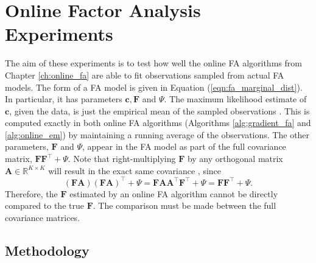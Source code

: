 \documentclass[msc,deptreport.inf]{infthesis} %
\newcommand{\matr}[1]{\mathbf{#1}}
\newcommand{\R}{\mathbb R}
\begin{document}
\chapter{Online Factor Analysis Experiments}\label{ch:online_fa_experiments}

The aim of these experiments is to test how well the online FA algorithms from Chapter \ref{ch:online_fa} are able to fit observations sampled from actual FA models. The form of a FA model is given in Equation (\ref{eqn:fa_marginal_dist}). In particular, it has parameters $\matr{c}, \matr{F}$ and $\Psi$. The maximum likelihood estimate of $\matr{c}$, given the data, is just the empirical mean of the sampled observations \cite{barber2007}. This is computed exactly in both online FA algorithms (Algorithms \ref{alg:gradient_fa} and \ref{alg:online_em}) by maintaining a running average of the observations. The other parameters, $\matr{F}$ and $\Psi$, appear in the FA model as part of the full covariance matrix,  $\matr{F}\matr{F}^\intercal + \Psi$. Note that right-multiplying $\matr{F}$ by any orthogonal matrix $\matr{A} \in \R^{K \times K}$ will result in the exact same covariance \cite{barber2007}, since
\begin{equation}
	(\matr{F} \matr{A}) (\matr{F} \matr{A})^\intercal + \Psi
	= \matr{F} \matr{A} \matr{A}^\intercal \matr{F}^\intercal + \Psi
	= \matr{F} \matr{F}^\intercal + \Psi.
\end{equation}
Therefore, the $\matr{F}$ estimated by an online FA algorithm cannot be directly compared to the true $\matr{F}$. The comparison must be made between the full covariance matrices.  

\section{Methodology}
\end{document}
